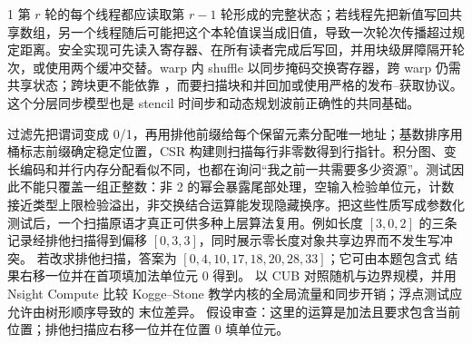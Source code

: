 \begin{solutionexercise}{1}
第 $r$ 轮的每个线程都应读取第 $r-1$ 轮形成的完整状态；若线程先把新值写回共享数组，另一个线程随后可能把这个本轮值误当成旧值，导致一次轮次传播超过规定距离。安全实现可先读入寄存器、在所有读者完成后写回，并用块级屏障隔开轮次，或使用两个缓冲交替。warp 内 shuffle 以同步掩码交换寄存器，跨 warp 仍需共享状态；跨块更不能依靠 ，而要扫描块和并回加或使用严格的发布--获取协议。这个分层同步模型也是 stencil 时间步和动态规划波前正确性的共同基础。

过滤先把谓词变成 0/1，再用排他前缀给每个保留元素分配唯一地址；基数排序用桶标志前缀确定稳定位置，CSR 构建则扫描每行非零数得到行指针。积分图、变长编码和并行内存分配看似不同，也都在询问“我之前一共需要多少资源”。测试因此不能只覆盖一组正整数：非 2 的幂会暴露尾部处理，空输入检验单位元，计数接近类型上限检验溢出，非交换结合运算能发现隐藏换序。把这些性质写成参数化测试后，一个扫描原语才真正可供多种上层算法复用。例如长度 $[3,0,2]$ 的三条记录经排他扫描得到偏移 $[0,3,3]$，同时展示零长度对象共享边界而不发生写冲突。
\variantheading 若改求排他扫描，答案为 $[0,4,10,17,18,20,28,33]$；它可由本题包含式
结果右移一位并在首项填加法单位元 0 得到。
\practiceheading 以 CUB  对照随机与边界规模，并用 Nsight
Compute 比较 Kogge--Stone 教学内核的全局流量和同步开销；浮点测试应允许由树形顺序导致的
末位差异。
假设审查：这里的运算是加法且要求包含当前位置；排他扫描应右移一位并在位置 0 填单位元。
\end{solutionexercise}

